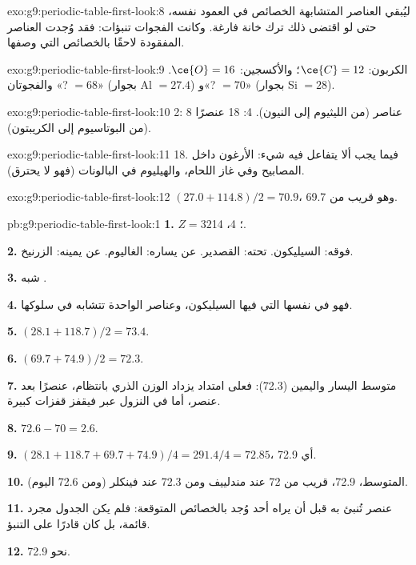 \begin{solution}{exo:g9:periodic-table-first-look:8}
ليُبقي العناصر المتشابهة الخصائص في العمود نفسه، حتى لو اقتضى ذلك ترك خانة
فارغة. وكانت الفجوات تنبؤات: فقد وُجدت العناصر المفقودة لاحقًا بالخصائص التي
وصفها.
\end{solution}

\begin{solution}{exo:g9:periodic-table-first-look:9}
الكربون: $\ce{C} = 12$؛ والأكسجين: $\ce{O} = 16$. والفجوتان «? $= 68$» (بجوار
Al $= 27.4$) و«? $= 70$» (بجوار Si $= 28$).
\end{solution}

\begin{solution}{exo:g9:periodic-table-first-look:10}
 2: 8 عناصر (من الليثيوم إلى النيون).  4: 18 عنصرًا (من البوتاسيوم
إلى الكريبتون).
\end{solution}

\begin{solution}{exo:g9:periodic-table-first-look:11}
 18. فيما يجب ألا يتفاعل فيه شيء: الأرغون داخل المصابيح وفي غاز
اللحام، والهيليوم في البالونات (فهو لا يحترق).
\end{solution}

\begin{solution}{exo:g9:periodic-table-first-look:12}
$(27.0 + 114.8)/2 = 70.9$، وهو قريب من 69.7.
\end{solution}

\begin{solution}{pb:g9:periodic-table-first-look:1}
\textbf{1.} $Z = 32$؛  4،  14.

\textbf{2.} فوقه: السيليكون. تحته: القصدير. عن يساره: الغاليوم. عن يمينه: الزرنيخ.

\textbf{3.} شبه .

\textbf{4.} فهو في  نفسها التي فيها السيليكون، وعناصر  الواحدة
تتشابه في سلوكها.

\textbf{5.} $(28.1 + 118.7)/2 = 73.4$.

\textbf{6.} $(69.7 + 74.9)/2 = 72.3$.

\textbf{7.} متوسط اليسار واليمين (72.3): فعلى امتداد  يزداد الوزن الذري
بانتظام، عنصرًا بعد عنصر، أما في النزول عبر  فيقفز قفزات كبيرة.

\textbf{8.} $72.6 - 70 = 2.6$.

\textbf{9.} $(28.1 + 118.7 + 69.7 + 74.9)/4 = 291.4/4 = 72.85$، أي
72.9.

\textbf{10.} المتوسط، 72.9، قريب من 72 عند مندلييف ومن 72.3 عند فينكلر
(ومن 72.6 اليوم).

\textbf{11.} عنصر تُنبئ به قبل أن يراه أحد وُجد بالخصائص المتوقعة: فلم يكن
الجدول مجرد قائمة، بل كان قادرًا على التنبؤ.

\textbf{12.} نحو 72.9.
\end{solution}
